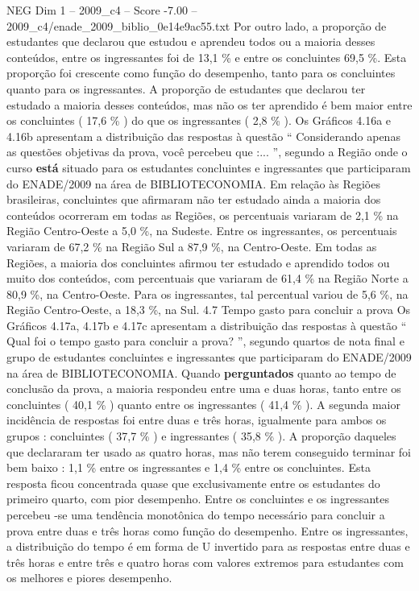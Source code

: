 \begin{textsample}{NEG Dim 1 – 2009\_c4 – Score -7.00 – 2009\_c4/enade\_2009\_biblio\_0e14e9ac55.txt}
Por outro lado, a proporção de estudantes que declarou que estudou e aprendeu todos ou a maioria desses conteúdos, entre os ingressantes foi de 13,1 \% e entre os concluintes 69,5 \%.
Esta proporção foi crescente como função do desempenho, tanto para os concluintes quanto para os ingressantes.
A proporção de estudantes que declarou ter estudado a maioria desses conteúdos, mas não os ter aprendido é bem maior entre os concluintes ( 17,6 \% ) do que os ingressantes ( 2,8 \% ).
Os Gráficos 4.16a e 4.16b apresentam a distribuição das respostas à questão “ Considerando apenas as questões objetivas da prova, você percebeu que :... ”, segundo a Região onde o curso \textbf{está} situado para os estudantes concluintes e ingressantes que participaram do ENADE/2009 na área de BIBLIOTECONOMIA.
Em relação às Regiões brasileiras, concluintes que afirmaram não ter estudado ainda a maioria dos conteúdos ocorreram em todas as Regiões, os percentuais variaram de 2,1 \% na Região Centro-Oeste a 5,0 \%, na Sudeste.
Entre os ingressantes, os percentuais variaram de 67,2 \% na Região Sul a 87,9 \%, na Centro-Oeste.
Em todas as Regiões, a maioria dos concluintes afirmou ter estudado e aprendido todos ou muito dos conteúdos, com percentuais que variaram de 61,4 \% na Região Norte a 80,9 \%, na Centro-Oeste.
Para os ingressantes, tal percentual variou de 5,6 \%, na Região Centro-Oeste, a 18,3 \%, na Sul. 4.7 Tempo gasto para concluir a prova Os Gráficos 4.17a, 4.17b e 4.17c apresentam a distribuição das respostas à questão “ Qual foi o tempo gasto para concluir a prova? ”, segundo quartos de nota final e grupo de estudantes concluintes e ingressantes que participaram do ENADE/2009 na área de BIBLIOTECONOMIA.
Quando \textbf{perguntados} quanto ao tempo de conclusão da prova, a maioria respondeu entre uma e duas horas, tanto entre os concluintes ( 40,1 \% ) quanto entre os ingressantes ( 41,4 \% ).
A segunda maior incidência de respostas foi entre duas e três horas, igualmente para ambos os grupos : concluintes ( 37,7 \% ) e ingressantes ( 35,8 \% ).
A proporção daqueles que declararam ter usado as quatro horas, mas não terem conseguido terminar foi bem baixo : 1,1 \% entre os ingressantes e 1,4 \% entre os concluintes.
Esta resposta ficou concentrada quase que exclusivamente entre os estudantes do primeiro quarto, com pior desempenho.
Entre os concluintes e os ingressantes percebeu -se uma tendência monotônica do tempo necessário para concluir a prova entre duas e três horas como função do desempenho.
Entre os ingressantes, a distribuição do tempo é em forma de U invertido para as respostas entre duas e três horas e entre três e quatro horas com valores extremos para estudantes com os melhores e piores desempenho.

\end{textsample}
